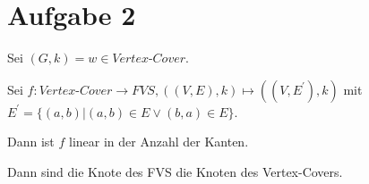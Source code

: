 \section*{Aufgabe 2}

Sei $(G,k) =  w \in  \textit{Vertex-Cover}$.

Sei $f: \textit{Vertex-Cover} \to FVS, ((V,E),k) \mapsto ((V,E^\prime),k)$ mit
 $E^\prime = \{(a,b) | (a,b) \in E \vee (b,a) \in E  \}$.
 
 Dann ist $f$ linear in der Anzahl der Kanten.
 

 Dann sind die Knote des FVS die Knoten des Vertex-Covers.